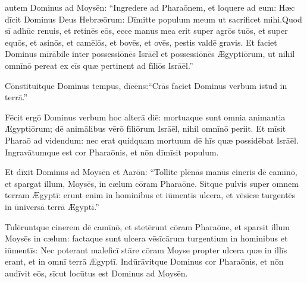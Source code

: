 

\thispagestyle{empty}

 autem Dominus ad Moysēn: ``Ingre\-dere ad Pharaōnem, et loquere ad eum: Hæc dīcit
Dominus Deus Hebræōrum: Dīmitte populum meum ut
sacrificet mihi.\linebreak{}Quod sī adhūc renuis, et retinēs
eōs,  ecce manus mea erit super agrōs tuōs, et super equōs, et asinōs, et
camēlōs, et bovēs, et ovēs, pestis valdē gravis.  Et faciet Dominus mīrābile
inter possessiōnēs Isrāēl et possessiōnēs
Ægyptiōrum, ut nihil omnīnō pereat ex eīs quæ
pertinent ad fīliōs Isrāēl.''

Cōnstituitque Dominus tempus, dīcēns:\linebreak``Crās faciet Dominus verbum istud in
terrā.'' 

Fēcit ergō Dominus verbum hoc
alterā diē: mortuaque sunt omnia animantia Ægyptiōrum; dē animālibus vērō
fīliōrum Isrāēl, nihil omnīnō periit.  Et mīsit Pharaō ad
videndum: nec erat quidquam mortuum dē hīs quæ possidēbat Isrāēl.
Ingravātumque est cor
Pharaōnis, et nōn dīmīsit populum.

Et dīxit Dominus ad
Moysēn et Aarōn: ``Tollite plēnās manūs cineris dē
camīnō, et spargat illum, Moysēs, in cælum
cōram Pharaōne.  Sitque pulvis super omnem terram Æ\-gyptī: erunt enim in hominibus et
iūmentīs ulcera, et vēsīcæ
turgentēs in ūniversā terrā Ægyptī.''

Tulēruntque
cinerem dē camīnō, et stetērunt cōram Pharaōne, et sparsit
illum Moysēs in cælum: factaque sunt ulcera vēsīcārum
turgentium in hominibus et iūmentīs:  Nec poterant
maleficī stāre cōram Moyse propter ulcera quæ in illīs
erant, et in omnī terrā Ægyptī.  Indūrāvitque Dominus cor Pharaōnis, et nōn audīvit eōs, sīcut
locūtus est Dominus ad Moysēn.

